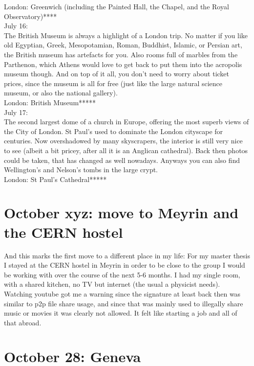 London: Greenwich (including the Painted Hall, the Chapel, and the Royal Observatory)****\\

July 16:\\
The British Museum is always a highlight of a London trip. No matter if you like old Egyptian, Greek, Mesopotamian, Roman, Buddhist, Islamic, or Persian art, the British museum has artefacts for you. Also rooms full of marbles from the Parthenon, which Athens would love to get back to put them into the acropolis museum though. And on top of it all, you don't need to worry about ticket prices, since the museum is all for free (just like the large natural science museum, or also the national gallery).\\

London: British Museum*****\\

July 17:\\
The second largest dome of a church in Europe, offering the most superb views of the City of London. St Paul's used to dominate the London cityscape for centuries. Now overshadowed by many skyscrapers, the interior is still very nice to see (albeit a bit pricey, after all it is an Anglican cathedral). Back then photos could be taken, that has changed as well nowadays. Anyways you can also find Wellington's and Nelson's tombs in the large crypt.\\

London: St Paul's Cathedral*****

\section{October xyz: move to Meyrin and the CERN hostel}
\label{moveMeyrin}

And this marks the first move to a different place in my life: For my master thesis I stayed at the CERN hostel in Meyrin in order to be close to the group I would be working with over the course of the next 5-6 months. I had my single room, with a shared kitchen, no TV but internet (the usual a physicist needs). Watching youtube got me a warning since the signature at least back then was similar to p2p file share usage, and since that was mainly used to illegally share music or movies it was clearly not allowed. It felt like starting a job and all of that abroad.

\section{October 28: Geneva}
\label{2006:Geneva}

